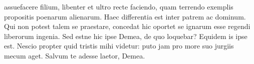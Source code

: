 assuefacere filium, libenter et ultro recte faciendo, quam terrendo exemplis propositis poenarum alienarum. Haec differentia est inter patrem ac dominum. Qui non potest talem se praestare, concedat hic oportet se ignarum esse regendi liberorum ingenia. Sed estne hic ipse Demea, de quo loquebar? Equidem is ipse est. Nescio propter quid tristis mihi videtur: puto jam pro more suo jurgiis mecum aget. Salvum te adesse laetor, Demea.


